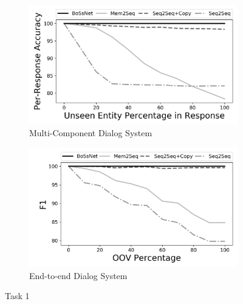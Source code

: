 \begin{figure}[!t]
\vspace*{0.5in}

\centering
\begin{subfigure}{0.8\textwidth}
 \includegraphics[width=\linewidth]{assets/graphs/task1_Acc.png}
 \caption{Multi-Component Dialog System}\label{fig:systemfull}
\end{subfigure}

\vspace*{0.5in}

\begin{subfigure}{0.8\textwidth}
 \includegraphics[width=\linewidth]{assets/graphs/task1_F1.png}
 \caption{End-to-end Dialog System}\label{fig:end2end}
\end{subfigure}

\caption{Task 1}
\vspace*{0.5in}

\end{figure}

\clearpage


